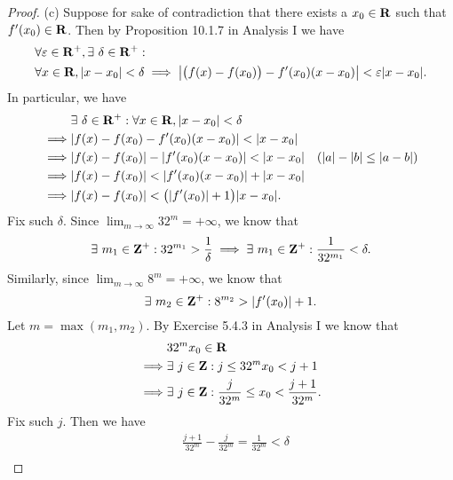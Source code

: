 \begin{proof}{(c)}
    Suppose for sake of contradiction that there exists a \(x_0 \in \mathbf{R}\) such that \(f'(x_0) \in \mathbf{R}\).
    Then by Proposition 10.1.7 in Analysis I we have
    \begin{align*}
         & \forall \varepsilon \in \R^+, \exists\ \delta \in \R^+ :                                                                         \\
         & \forall x \in \R, \abs{x - x_0} < \delta \implies \abs{\big(f(x) - f(x_0)\big) - f'(x_0) (x - x_0)} < \varepsilon \abs{x - x_0}.
    \end{align*}
    In particular, we have
    \begin{align*}
                 & \exists\ \delta \in \R^+ : \forall x \in \R, \abs{x - x_0} < \delta                                        \\
        \implies & \abs{f(x) - f(x_0) - f'(x_0) (x - x_0)} < \abs{x - x_0}                                                    \\
        \implies & \abs{f(x) - f(x_0)} - \abs{f'(x_0) (x - x_0)} < \abs{x - x_0}       & (\abs{a} - \abs{b} \leq \abs{a - b}) \\
        \implies & \abs{f(x) - f(x_0)} < \abs{f'(x_0) (x - x_0)} + \abs{x - x_0}                                              \\
        \implies & \abs{f(x) - f(x_0)} < \big(\abs{f'(x_0)} + 1\big) \abs{x - x_0}.
    \end{align*}
    Fix such \(\delta\).
    Since \(\lim_{m \to \infty} 32^m = +\infty\), we know that
    \[
        \exists\ m_1 \in \mathbf{Z}^+ : 32^{m_1} > \frac{1}{\delta} \implies \exists\ m_1 \in \mathbf{Z}^+ : \frac{1}{32^{m_1}} < \delta.
    \]
    Similarly, since \(\lim_{m \to \infty} 8^m = +\infty\), we know that
    \[
        \exists\ m_2 \in \mathbf{Z}^+ : 8^{m_2} > \left\lvert f'(x_0)\right\rvert + 1.
    \]
    Let \(m = \max(m_1, m_2)\).
    By Exercise 5.4.3 in Analysis I we know that
    \begin{align*}
                 & 32^m x_0 \in \mathbf{R}                                                   \\
        \implies & \exists\ j \in \mathbf{Z} : j \leq 32^m x_0 < j + 1                       \\
        \implies & \exists\ j \in \mathbf{Z} : \frac{j}{32^m} \leq x_0 < \frac{j + 1}{32^m}.
    \end{align*}
    Fix such \(j\).
    Then we have
    \begin{align*}
                 & \frac{j + 1}{32^m} - \frac{j}{32^m} = \frac{1}{32^m} < \delta                                                                                                    \\

\end{align*}
\end{proof}
